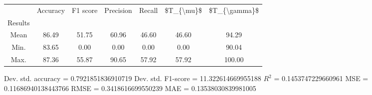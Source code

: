 \begin{tabular}{|c|c|c|c|c|c|c|}
\toprule
{} &  Accuracy &  F1 score &  Precision &  Recall &  \$T\_\{\textbackslash mu\}\$ &  \$T\_\{\textbackslash gamma\}\$ \\
Results &           &           &            &         &            &               \\
\hline
Mean    &     86.49 &     51.75 &      60.96 &   46.60 &      46.60 &         94.29 \\
Min.    &     83.65 &      0.00 &       0.00 &    0.00 &       0.00 &         90.04 \\
Max.    &     87.36 &     55.87 &      90.65 &   57.92 &      57.92 &        100.00 \\
\bottomrule
\end{tabular}

 Dev. std. accuracy = 0.7921851836910719
 Dev. std. F1-score = 11.322614669955188
 $R^2$ = 0.1453747229660961
 MSE = 0.11686940138443766
 RMSE = 0.3418616699550239
 MAE = 0.13538030839981005